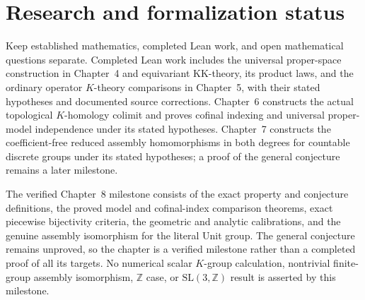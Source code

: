 \section{Research and formalization status}
Keep established mathematics, completed Lean work, and open mathematical
questions separate. Completed Lean work includes the universal proper-space
construction in Chapter~4 and equivariant KK-theory, its product laws, and
the ordinary operator $K$-theory comparisons in Chapter~5, with their stated
hypotheses and documented source corrections. Chapter~6 constructs the actual
topological $K$-homology colimit and proves cofinal indexing and universal
proper-model independence under its stated hypotheses. Chapter~7 constructs the coefficient-free reduced assembly homomorphisms
in both degrees for countable discrete groups under its stated hypotheses;
a proof of the general conjecture remains a later milestone.

The verified Chapter~8 milestone consists of the exact property and conjecture
definitions, the proved model and cofinal-index comparison theorems, exact
piecewise bijectivity criteria, the geometric and analytic calibrations,
and the genuine assembly isomorphism for the literal Unit group. The general
conjecture remains unproved, so the chapter is a verified milestone rather
than a completed proof of all its targets. No numerical scalar $K$-group
calculation, nontrivial finite-group assembly isomorphism, $\mathbb Z$ case,
or $\mathrm{SL}(3,\mathbb Z)$ result is asserted by this milestone.
